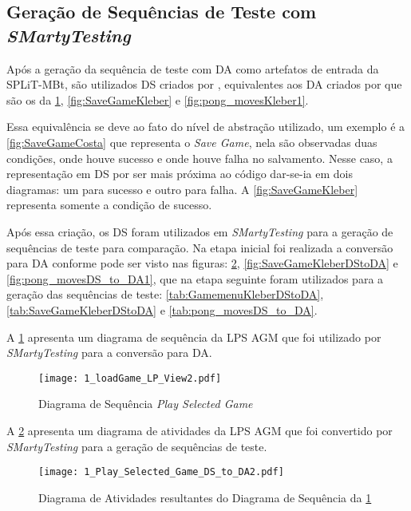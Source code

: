 \newpage

\subsection{Geração de Sequências de Teste com \textit{SMartyTesting}}
\label{cap4subsubsec:diagrama_sequencia}

Após a geração da sequência de teste com DA como artefatos de entrada da SPLiT-MBt, são utilizados DS criados por \citet{marcolino2017variability}, equivalentes aos DA criados por \citet{costa2016split} que são os da \ref{fig:GamemenuKleber}, \ref{fig:SaveGameKleber} e \ref{fig:pong_movesKleber1}.


Essa equivalência se deve ao fato do nível de abstração utilizado, um exemplo é a \ref{fig:SaveGameCosta} que representa o \textit{Save Game}, nela são observadas duas condições, onde houve sucesso e onde houve falha no salvamento. Nesse caso, a representação em DS por ser mais próxima ao código dar-se-ia em dois diagramas: um para sucesso e outro para falha. A \ref{fig:SaveGameKleber} representa somente a condição de sucesso.   

Após essa criação, os DS foram utilizados em \textit{SMartyTesting} para a geração de sequências de teste para comparação. Na etapa inicial foi realizada a conversão para DA conforme pode ser visto nas figuras: \ref{fig:GamemenuKleberDStoDA}, \ref{fig:SaveGameKleberDStoDA} e \ref{fig:pong_movesDS_to_DA1}, que na etapa seguinte foram utilizados para a geração das sequências de teste: \ref{tab:GamemenuKleberDStoDA}, \ref{tab:SaveGameKleberDStoDA} e \ref{tab:pong_movesDS_to_DA}.

A \ref{fig:GamemenuKleber} apresenta um diagrama de sequência da LPS AGM que foi utilizado por \textit{SMartyTesting} para a conversão para DA.

	\begin{figure}[H]
		\centering
		\texttt{[image: 1\_loadGame\_LP\_View2.pdf]}
		\caption{Diagrama de Sequência \textit{Play Selected Game} \cite{marcolino2017variability}}
		\label{fig:GamemenuKleber}
	\end{figure}

A \ref{fig:GamemenuKleberDStoDA} apresenta um diagrama de atividades da LPS AGM que foi convertido por \textit{SMartyTesting} para a geração de sequências de teste.

	\begin{figure}[H]
		\centering
		\texttt{[image: 1\_Play\_Selected\_Game\_DS\_to\_DA2.pdf]}
		\caption{Diagrama de Atividades resultantes do Diagrama de Sequência da \ref{fig:GamemenuKleber}}
		\label{fig:GamemenuKleberDStoDA}
	\end{figure}

